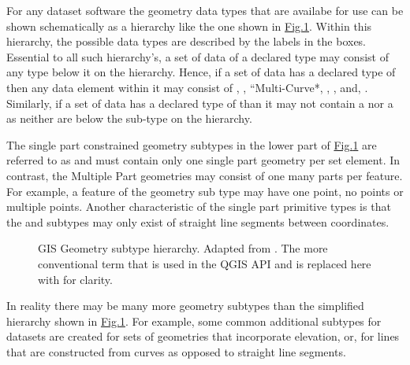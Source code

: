 \documentclass[letterpaper,11pt,english]{sphinxmanual}
\begin{document}
For any dataset software the geometry data types that are availabe for use can be shown schematically as a hierarchy like the one shown in \hyperref[\detokenize{concept:figuregeomtypei}]{Fig.\@ \ref{\detokenize{concept:figuregeomtypei}}}.  Within this hierarchy, the possible data types are described by the labels in the boxes.  Essential to all such hierarchy’s, a set of data of a declared type may consist of any type below it on the hierarchy.  Hence, if a set of data has a declared type of  then any data element within it may consist of , , “Multi-Curve*, , , and, .  Similarly, if a set of data has a declared type of  than it may not contain a  nor a  as neither are below the sub-type  on the hierarchy.

The single part constrained geometry subtypes in the lower part of \hyperref[\detokenize{concept:figuregeomtypei}]{Fig.\@ \ref{\detokenize{concept:figuregeomtypei}}} are referred to as  and must contain only one single part geometry per set element.  In contrast, the Multiple Part geometries may consist of one  many parts per feature.  For example, a feature of the  geometry sub type may have one point, no points or multiple points. Another characteristic of the single part primitive types is that the  and  subtypes may only exist of straight line segments between coordinates.

\begin{figure}[htbp]
\centering
\capstart

\noindent{}
\caption{GIS Geometry subtype hierarchy.  Adapted from .  The more conventional term  that is used in the QGIS API and  is replaced here with  for clarity.}\label{\detokenize{concept:id46}}\label{\detokenize{concept:figuregeomtypei}}\end{figure}

In reality there may be many more geometry subtypes than the simplified hierarchy shown in \hyperref[\detokenize{concept:figuregeomtypei}]{Fig.\@ \ref{\detokenize{concept:figuregeomtypei}}}.  For example, some common additional subtypes for datasets are created for sets of geometries that incorporate elevation, or, for lines that are constructed from curves as opposed to straight line segments.
\end{document}
